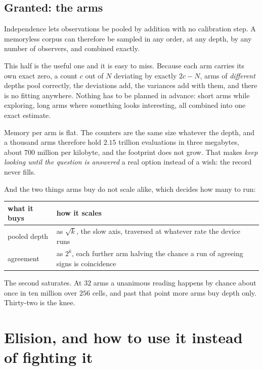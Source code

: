 \subsection{Granted: the arms}

Independence lets observations be pooled by addition with no calibration step. A memoryless corpus can therefore be sampled in any order, at any depth, by any number of observers, and combined exactly.

This half is the useful one and it is easy to miss. Because each arm carries its own exact zero, a count \(c\) out of \(N\) deviating by exactly \(2c - N\), arms of \emph{different} depths pool correctly, the deviations add, the variances add with them, and there is no fitting anywhere. Nothing has to be planned in advance: short arms while exploring, long arms where something looks interesting, all combined into one exact estimate.

Memory per arm is flat. The counters are the same size whatever the depth, and a thousand arms therefore hold \(2.15\) trillion evaluations in three megabytes, about \(700\) million per kilobyte, and the footprint does not grow. That makes \emph{keep looking until the question is answered} a real option instead of a wish: the record never fills.

And the two things arms buy do not scale alike, which decides how many to run:

\begin{center}
\begin{tabular}{@{}ll@{}}
\toprule
what it buys & how it scales \\
\midrule
pooled depth & as \(\sqrt{k}\), the slow axis, traversed at whatever rate the device runs \\
agreement & as \(2^{k}\), each further arm halving the chance a run of agreeing signs is coincidence \\
\bottomrule
\end{tabular}
\end{center}

The second saturates. At \(32\) arms a unanimous reading happens by chance about once in ten million over \(256\) cells, and past that point more arms buy depth only. Thirty-two is the knee.

\section{Elision, and how to use it instead of fighting it}

